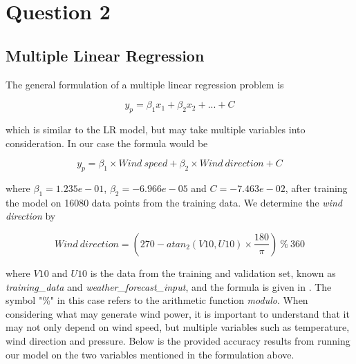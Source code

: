 \documentclass[
11pt, %
english, %
singlespacing, %
parskip, %
headsepline, %
]{report} %
\begin{document}
        
    
    
    
    
    
    
\section{Question 2}
	

\subsection{Multiple Linear Regression}

    The general formulation of a multiple linear regression problem is
    
    \begin{equation}
        y_{p} = \beta_{1}x_{1} + \beta_{2}x_{2} + ... + C
    \end{equation}
    
    which is similar to the LR model, but may take multiple variables into consideration. In our case the formula would be
    
    \begin{equation}
        y_{p} = \beta_{1} \times Wind\ speed + \beta_{2} \times Wind\ direction + C
    \end{equation}
    
    where $\beta_{1} = 1.235e-01$, $\beta_{2} = -6.966e-05$ and $C = -7.463e-02$, after training the model on 16080 data points from the training data. We determine the \emph{wind direction} by
    
    \begin{equation}
        Wind\ direction = (270 - atan_{2}(V10,U10) \times \frac{180}{\pi})\ \%\ 360
    \end{equation}
	
 	where $V10$ and $U10$ is the data from the training and validation set, known as \emph{training\_data} and \emph{weather\_forecast\_input}, and the formula is given in \cite{winddir}. The symbol "\%" in this case refers to the arithmetic function \emph{modulo}. When considering what may generate wind power, it is important to understand that it may not only depend on wind speed, but multiple variables such as temperature, wind direction and pressure. Below is the provided accuracy results from running our model on the two variables mentioned in the formulation above.
 	
\end{document}
